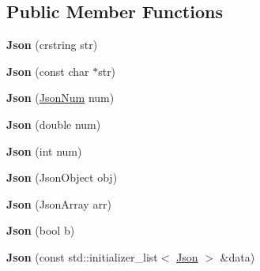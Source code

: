 \subsection*{Public Member Functions}
\begin{DoxyCompactItemize}
\item 
\mbox{\label{classnta_1_1utils_1_1Json_ac5545c76dd66497cb21edc184f54ffc6}} 
{\bfseries Json} (crstring str)
\item 
\mbox{\label{classnta_1_1utils_1_1Json_abf8ba44154d7599b3ca25258c01aa942}} 
{\bfseries Json} (const char $\ast$str)
\item 
\mbox{\label{classnta_1_1utils_1_1Json_a0460390bd414652905615907ceb3ada7}} 
{\bfseries Json} (\hyperlink{classnta_1_1utils_1_1JsonNum}{Json\+Num} num)
\item 
\mbox{\label{classnta_1_1utils_1_1Json_acc9de30296d8e0d02b63d57f874ea7bf}} 
{\bfseries Json} (double num)
\item 
\mbox{\label{classnta_1_1utils_1_1Json_aba92a41e2aac44739cf2e77a915c04d6}} 
{\bfseries Json} (int num)
\item 
\mbox{\label{classnta_1_1utils_1_1Json_aec39487dbef21bd53b7d4d0bdb2642c2}} 
{\bfseries Json} (Json\+Object obj)
\item 
\mbox{\label{classnta_1_1utils_1_1Json_aadd85ffafca337080613b36c1e4777f3}} 
{\bfseries Json} (Json\+Array arr)
\item 
\mbox{\label{classnta_1_1utils_1_1Json_a7798a8f8a99468552f505ed3fc2dd86d}} 
{\bfseries Json} (bool b)
\item 
\mbox{\label{classnta_1_1utils_1_1Json_ac2987fdc6d1fc751b9072cc95c09ecd7}} 
{\bfseries Json} (const std\+::initializer\+\_\+list$<$ \hyperlink{classnta_1_1utils_1_1Json}{Json} $>$ \&data)
\item 
\mbox{\label{classnta_1_1utils_1_1Json_a77c547bae6a9f97f14e41f235226044c}} 

\end{DoxyCompactItemize}

